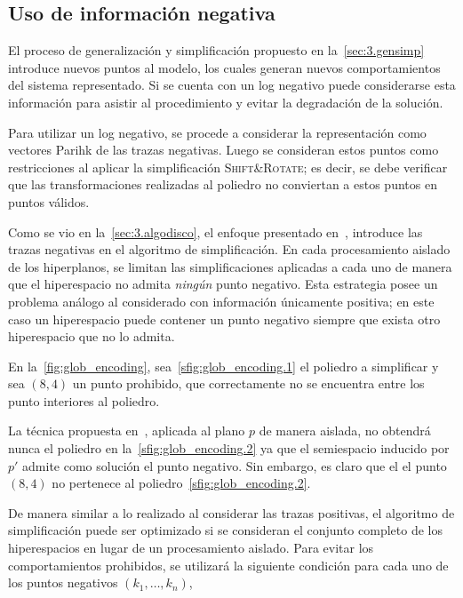 \subsection{Uso de información negativa}
\label{sec:3.gensimp negative}

El proceso de generalización y simplificación propuesto en la~\autoref{sec:3.gensimp} introduce nuevos puntos al modelo, 
los cuales generan nuevos comportamientos del sistema representado. Si se cuenta con un log negativo
puede considerarse esta información para asistir al procedimiento y evitar la degradación
de la solución.

Para utilizar un log negativo, se procede a considerar la representación como vectores Parihk de las trazas negativas.
Luego se consideran estos puntos como restricciones al aplicar la simplificación \textsc{Shift\&Rotate}; es decir, se debe 
verificar que las transformaciones realizadas al poliedro no conviertan a estos puntos en puntos válidos.

Como se vio en la~\autoref{sec:3.algodisco}, el enfoque presentado en~\cite{LeonCB15},
introduce las trazas negativas en el algoritmo de simplificación.
En cada procesamiento aislado de los hiperplanos, se limitan las simplificaciones 
aplicadas a cada uno de manera que el hiperespacio no admita \emph{ningún} punto negativo.
Esta estrategia posee un problema análogo al considerado con información únicamente positiva; en este caso
un hiperespacio puede contener un punto negativo siempre que exista otro hiperespacio
que no lo admita.

\begin{example}
    En la~\autoref{fig:glob_encoding}, sea~\autoref{sfig:glob_encoding.1} el poliedro
    a simplificar y sea $(8,4)$ un punto prohibido, que correctamente no se encuentra entre los
    punto interiores al poliedro.
    
    La técnica propuesta en~\cite{LeonCB15}, aplicada al plano $p$ de manera aislada, 
    no obtendrá nunca el poliedro en la~\autoref{sfig:glob_encoding.2} ya que
    el semiespacio inducido por $p'$ admite como solución el punto negativo. Sin embargo, es claro que el
    el punto $(8,4)$ no pertenece al poliedro~\autoref{sfig:glob_encoding.2}.
\end{example}

De manera similar a lo realizado al considerar las trazas positivas, el algoritmo de simplificación
puede ser optimizado si se consideran el conjunto completo de los hiperespacios en lugar de un
procesamiento aislado. 
Para evitar los comportamientos prohibidos, se utilizará la siguiente condición para cada 
uno de los puntos negativos $(k_1,\dots,k_n)$,

